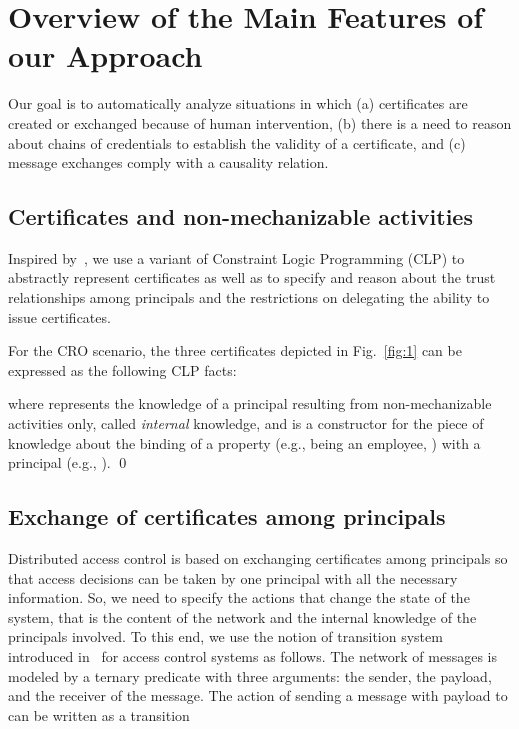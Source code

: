 \documentclass[conference]{llncs}
\newcommand{\CRO}{CRO}
\begin{document}
\section{Overview of the Main Features of our Approach}
\label{sec:ex-overview}
Our goal is to automatically analyze situations in which (a)
certificates are created or exchanged because of human intervention, (b)
there is a need to reason about chains of credentials to establish the
validity of a certificate, and (c) message exchanges comply with a
causality relation.
\subsection{Certificates and non-mechanizable activities} 
Inspired by~\cite{constraintdatalog,GurevichNeeman-dkal}, we use a variant of
Constraint Logic Programming (CLP) to abstractly represent certificates
as well as to specify and reason about the trust relationships among
principals and the restrictions on delegating the ability to issue
certificates. 
\begin{example}
\label{ex:certsf}
For the \CRO{} scenario, the three certificates depicted
in Fig.~\ref{fig:1} can be expressed as the following CLP facts: 

where  represents the knowledge of
a principal resulting from non-mechanizable activities only,
called \emph{internal} knowledge, and  is a constructor for the
piece of knowledge about the binding of a property (e.g., being an
employee, ) with a principal (e.g., ).
\qed
\end{example}

\subsection{Exchange of certificates among principals} 
\label{subsec:exchangecerts}
Distributed access control is based on exchanging  certificates among principals
so that access decisions can be taken by one principal with all the necessary information. 
So, we need to specify the actions that change the state of the system,
that is the content of the network and the internal knowledge of the principals involved. 
To this end, we use the notion of transition system introduced in~\cite{lietal2005} for
access control systems as follows. The network of messages is modeled by
a ternary predicate  with three arguments: the sender, the payload, and
the receiver of the message. The action of  sending a message with
payload  to  can be written as a transition
\end{document}

